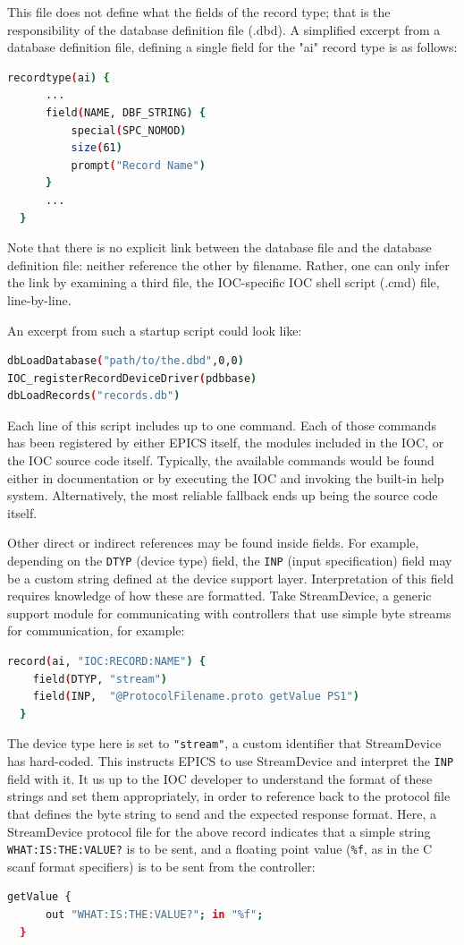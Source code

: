 \documentclass[letter,
               keeplastbox,   %
               ]{jacow}
\begin{document}
This file does not define what the fields of the record type; that is the
responsibility of the database definition file (.dbd). A simplified excerpt
from a database definition file, defining a single field
for the "ai" record type is as follows:

\begin{lstlisting}[language=bash]
  recordtype(ai) {
      ...
      field(NAME, DBF_STRING) {
          special(SPC_NOMOD)
          size(61)
          prompt("Record Name")
      }
      ...
  }
\end{lstlisting}

Note that there is no explicit link between the database file and the database
definition file: neither reference the other by filename.
Rather, one can only infer the link by examining a third file, the IOC-specific
IOC shell script (.cmd) file, line-by-line.

An excerpt from such a startup script could look like:
\begin{lstlisting}[language=bash]
dbLoadDatabase("path/to/the.dbd",0,0)
IOC_registerRecordDeviceDriver(pdbbase) 
dbLoadRecords("records.db")
\end{lstlisting}

Each line of this script includes up to one command. Each of those commands
has been registered by either EPICS itself, the modules included in the IOC,
or the IOC source code itself.  Typically, the available commands
would be found either in documentation or by executing the IOC and invoking the
built-in help system. Alternatively, the most reliable fallback ends up
being the source code itself.

Other direct or indirect references may be found inside fields.  
For example, depending on the \verb_DTYP_ (device type) field, the \verb_INP_
(input specification) field may be a custom string defined at the device
support layer. Interpretation of this field requires knowledge of how
these are formatted.  Take StreamDevice\cite{streamdevice}, a generic
support module for communicating with controllers that use simple byte
streams for communication, for example:
\begin{lstlisting}[language=bash]
  record(ai, "IOC:RECORD:NAME") {
    field(DTYP, "stream")
    field(INP,  "@ProtocolFilename.proto getValue PS1")
  }
\end{lstlisting}
The device type here is set to \verb_"stream"_, a custom identifier that
StreamDevice has hard-coded.  This instructs EPICS to use StreamDevice
and interpret the \verb_INP_ field with it.  It us up to the IOC developer to
understand the format of these strings and set them appropriately, in order
to reference back to the protocol file that defines the byte string to send
and the expected response format. Here, a StreamDevice protocol file for
the above record indicates that a simple string \verb_WHAT:IS:THE:VALUE?_
is to be sent, and a floating point value (\verb_%f_, as in the C scanf
format specifiers) is to be sent from the controller:
\begin{lstlisting}[language=bash]
  getValue {
      out "WHAT:IS:THE:VALUE?"; in "%f";
  }
\end{lstlisting}
\end{document}
